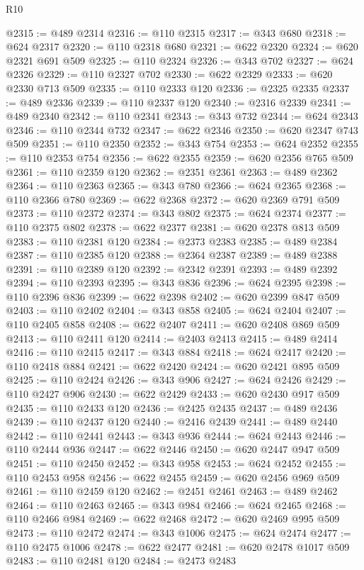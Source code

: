 \begin{lexlean}{R10}
\begin{coremodule}
@2315 := @489 @2314
@2316 := @110 @2315
@2317 := @343 @680
@2318 := @624 @2317
@2320 := @110 @2318 @680
@2321 := @622 @2320
@2324 := @620 @2321 @691 @509
@2325 := @110 @2324
@2326 := @343 @702
@2327 := @624 @2326
@2329 := @110 @2327 @702
@2330 := @622 @2329
@2333 := @620 @2330 @713 @509
@2335 := @110 @2333 @120
@2336 := @2325 @2335
@2337 := @489 @2336
@2339 := @110 @2337 @120
@2340 := @2316 @2339
@2341 := @489 @2340
@2342 := @110 @2341
@2343 := @343 @732
@2344 := @624 @2343
@2346 := @110 @2344 @732
@2347 := @622 @2346
@2350 := @620 @2347 @743 @509
@2351 := @110 @2350
@2352 := @343 @754
@2353 := @624 @2352
@2355 := @110 @2353 @754
@2356 := @622 @2355
@2359 := @620 @2356 @765 @509
@2361 := @110 @2359 @120
@2362 := @2351 @2361
@2363 := @489 @2362
@2364 := @110 @2363
@2365 := @343 @780
@2366 := @624 @2365
@2368 := @110 @2366 @780
@2369 := @622 @2368
@2372 := @620 @2369 @791 @509
@2373 := @110 @2372
@2374 := @343 @802
@2375 := @624 @2374
@2377 := @110 @2375 @802
@2378 := @622 @2377
@2381 := @620 @2378 @813 @509
@2383 := @110 @2381 @120
@2384 := @2373 @2383
@2385 := @489 @2384
@2387 := @110 @2385 @120
@2388 := @2364 @2387
@2389 := @489 @2388
@2391 := @110 @2389 @120
@2392 := @2342 @2391
@2393 := @489 @2392
@2394 := @110 @2393
@2395 := @343 @836
@2396 := @624 @2395
@2398 := @110 @2396 @836
@2399 := @622 @2398
@2402 := @620 @2399 @847 @509
@2403 := @110 @2402
@2404 := @343 @858
@2405 := @624 @2404
@2407 := @110 @2405 @858
@2408 := @622 @2407
@2411 := @620 @2408 @869 @509
@2413 := @110 @2411 @120
@2414 := @2403 @2413
@2415 := @489 @2414
@2416 := @110 @2415
@2417 := @343 @884
@2418 := @624 @2417
@2420 := @110 @2418 @884
@2421 := @622 @2420
@2424 := @620 @2421 @895 @509
@2425 := @110 @2424
@2426 := @343 @906
@2427 := @624 @2426
@2429 := @110 @2427 @906
@2430 := @622 @2429
@2433 := @620 @2430 @917 @509
@2435 := @110 @2433 @120
@2436 := @2425 @2435
@2437 := @489 @2436
@2439 := @110 @2437 @120
@2440 := @2416 @2439
@2441 := @489 @2440
@2442 := @110 @2441
@2443 := @343 @936
@2444 := @624 @2443
@2446 := @110 @2444 @936
@2447 := @622 @2446
@2450 := @620 @2447 @947 @509
@2451 := @110 @2450
@2452 := @343 @958
@2453 := @624 @2452
@2455 := @110 @2453 @958
@2456 := @622 @2455
@2459 := @620 @2456 @969 @509
@2461 := @110 @2459 @120
@2462 := @2451 @2461
@2463 := @489 @2462
@2464 := @110 @2463
@2465 := @343 @984
@2466 := @624 @2465
@2468 := @110 @2466 @984
@2469 := @622 @2468
@2472 := @620 @2469 @995 @509
@2473 := @110 @2472
@2474 := @343 @1006
@2475 := @624 @2474
@2477 := @110 @2475 @1006
@2478 := @622 @2477
@2481 := @620 @2478 @1017 @509
@2483 := @110 @2481 @120
@2484 := @2473 @2483

\end{coremodule}
\end{lexlean}
